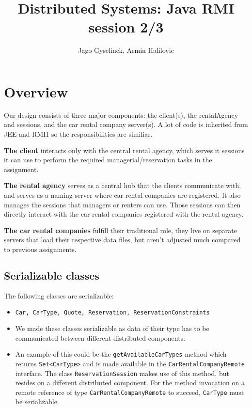\documentclass{scrartcl}
\title{Distributed Systems: Java RMI session 2/3}
\author{Jago Gyselinck, Armin Halilovic}
\begin{document}
	\maketitle

	\section{Overview}
	Our design consists of three major components: the client(s), the rentalAgency and sessions, and the car rental company server(s). A lot of code is inherited from JEE and RMI1 so the responsibilities are similiar. 
	
	\textbf{The client} interacts only with the central rental agency, which serves it sessions it can use to perform the required managerial/reservation tasks in the assignment. 
	
	\textbf{The rental agency} serves as a central hub that the clients communicate with, and serves as a naming server where car rental companies are registered. It also manages the sessions that managers or renters can use. Those sessions can then directly interact with the car rental companies registered with the rental agency.
	
	 \textbf{The car rental companies} fulfill their traditional role, they live on separate servers that load their respective data files, but aren't adjusted much compared to previous assignments.  

    \subsection{Serializable classes}
    The following classes are serializable: 
    \begin{itemize}
		\item \texttt{Car, CarType, Quote, Reservation, ReservationConstraints}
		\item We made these classes serializable as data of their type has to be
		communicated between different distributed components. 
		\item An example of this could be the \texttt{getAvailableCarTypes} method which returns \texttt{Set<CarType>} and is made available in the \texttt{CarRentalCompanyRemote} interface. 
		The class \texttt{ReservationSession} makes use of this method, but resides on a different distributed component. For the method invocation on a remote reference of type \texttt{CarRentalCompanyRemote} to succeed, \texttt{CarType} must be serializable.
	\end{itemize}
\end{document}

